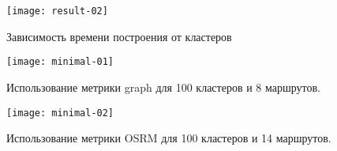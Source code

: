 \begin{figure}[ht!]
    \centering
    \texttt{[image: result-02]}
    \caption{Зависимость времени построения от кластеров}
    \label{fig:result-02}
\end{figure}

\begin{figure}[ht!]
    \centering
    \texttt{[image: minimal-01]}
    \caption{Использование метрики graph для 100 кластеров и 8 маршрутов.}
    \label{fig:network-01}
\end{figure}

\begin{figure}[ht!]
    \centering
    \texttt{[image: minimal-02]}
    \caption{Использование метрики OSRM для 100 кластеров и 14 маршрутов.}
    \label{fig:network-02}
\end{figure}

\clearpage

